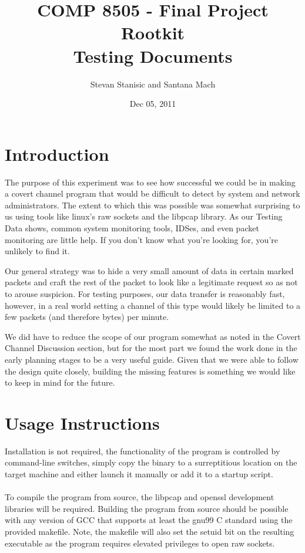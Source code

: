 \documentclass[titlepage]{article}
\begin{document}
\author{Stevan Stanisic and Santana Mach}
\title{COMP 8505 - Final Project \\ Rootkit \\ Testing Documents}
\date{Dec 05, 2011}
\maketitle{}

\tableofcontents
\pagebreak

\section{Introduction}

The purpose of this experiment was to see how successful we could be in making a covert channel program that would be difficult to detect by system and network administrators. The extent to which this was possible was somewhat surprising to us using tools like linux's raw sockets and the libpcap library.  As our Testing Data shows, common system monitoring  tools, IDSes, and even packet monitoring are little help.  If you don't know what you're looking for, you're unlikely to find it.

Our general strategy was to hide a very small amount of data in certain marked packets and craft the rest of the packet to look like a legitimate request so as not to arouse suspicion. For testing purposes, our data transfer is reasonably fast, however, in a real world setting a channel of this type would likely be limited to a few packets (and therefore bytes) per minute.

We did have to reduce the scope of our program somewhat as noted in the Covert Channel Discussion section, but for the most part we found the work done in the early planning stages to be a very useful guide.  Given that we were able to follow the design quite closely, building the missing features is something we would like to keep in mind for the future.

\section{Usage Instructions}

Installation is not required, the functionality of the program is controlled by command-line switches, simply copy the binary to a surreptitious location on the target machine and either launch it manually or add it to a startup script.\\
\\
To compile the program from source, the libpcap and openssl development libraries will be required.  Building the program from source should be possible with any version of GCC that supports at least the gnu99 C standard using the provided makefile.  Note, the makefile will also set the setuid bit on the resulting executable as the program requires elevated privileges to open raw sockets.\\
\end{document}
